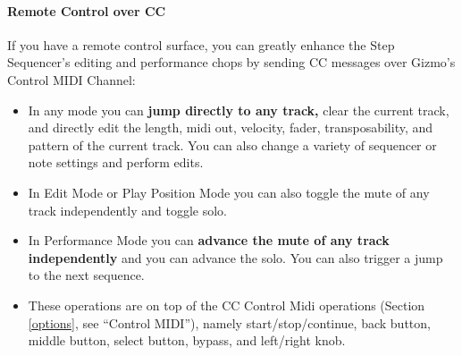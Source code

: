 \documentclass{article}
\begin{document}
\paragraph{Remote Control over CC}  If you have a remote control surface, you can greatly enhance the Step Sequencer's editing and performance chops by sending CC messages over Gizmo's Control MIDI Channel:

\begin{itemize}
\item In any mode you can {\bf jump directly to any track,} clear the current track, and directly edit the length, midi out, velocity, fader, transposability, and pattern of the current track.  You can also change a variety of sequencer or note settings and perform edits.

\item In Edit Mode or Play Position Mode you can also toggle the mute of any track independently and toggle solo.

\item In Performance Mode you can {\bf advance the mute of any track independently} and you can advance the solo.  You can also trigger a jump to the next sequence.

\item These operations are on top of the CC Control Midi operations (Section \ref{options}, see ``Control MIDI''), namely start/stop/continue, back button, middle button, select button, bypass, and left/right knob.
\end{itemize}
\end{document}
